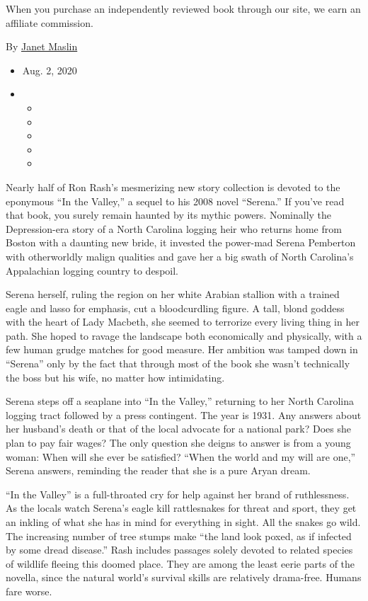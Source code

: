 When you purchase an independently reviewed book through our site, we
earn an affiliate commission.

By \href{https://www.nytimes3xbfgragh.onion/by/janet-maslin}{Janet
Maslin}

\begin{itemize}
\item
  Aug. 2, 2020
\item
  \begin{itemize}
  \item
  \item
  \item
  \item
  \item
  \end{itemize}
\end{itemize}

Nearly half of Ron Rash's mesmerizing new story collection is devoted to
the eponymous ``In the Valley,'' a sequel to his 2008 novel ``Serena.''
If you've read that book, you surely remain haunted by its mythic
powers. Nominally the Depression-era story of a North Carolina logging
heir who returns home from Boston with a daunting new bride, it invested
the power-mad Serena Pemberton with otherworldly malign qualities and
gave her a big swath of North Carolina's Appalachian logging country to
despoil.

Serena herself, ruling the region on her white Arabian stallion with a
trained eagle and lasso for emphasis, cut a bloodcurdling figure. A
tall, blond goddess with the heart of Lady Macbeth, she seemed to
terrorize every living thing in her path. She hoped to ravage the
landscape both economically and physically, with a few human grudge
matches for good measure. Her ambition was tamped down in ``Serena''
only by the fact that through most of the book she wasn't technically
the boss but his wife, no matter how intimidating.

Serena steps off a seaplane into ``In the Valley,'' returning to her
North Carolina logging tract followed by a press contingent. The year is
1931. Any answers about her husband's death or that of the local
advocate for a national park? Does she plan to pay fair wages? The only
question she deigns to answer is from a young woman: When will she ever
be satisfied? ``When the world and my will are one,'' Serena answers,
reminding the reader that she is a pure Aryan dream.

``In the Valley'' is a full-throated cry for help against her brand of
ruthlessness. As the locals watch Serena's eagle kill rattlesnakes for
threat and sport, they get an inkling of what she has in mind for
everything in sight. All the snakes go wild. The increasing number of
tree stumps make ``the land look poxed, as if infected by some dread
disease.'' Rash includes passages solely devoted to related species of
wildlife fleeing this doomed place. They are among the least eerie parts
of the novella, since the natural world's survival skills are relatively
drama-free. Humans fare worse.

